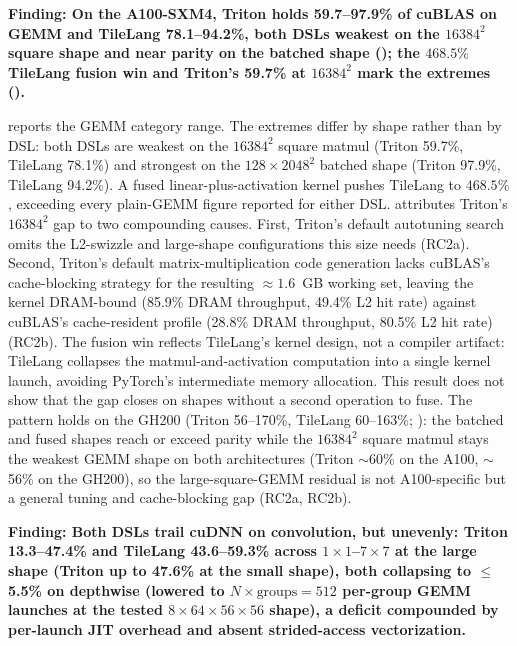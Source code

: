 \label{sec:eval:gemm}


\medskip\noindent\textbf{Finding: On the A100-SXM4, Triton holds 59.7--97.9\% of cuBLAS on GEMM and TileLang 78.1--94.2\%, both DSLs weakest on the $16384^2$ square shape and near parity on the batched shape (); the $468.5\%$ TileLang fusion win and Triton's 59.7\% at $16384^2$ mark the extremes ().}

 reports the GEMM category range. The extremes differ by shape rather than by DSL: both DSLs are weakest on the $16384^2$ square matmul (Triton 59.7\%, TileLang 78.1\%) and strongest on the $128\times2048^2$ batched shape (Triton 97.9\%, TileLang 94.2\%). A fused linear-plus-activation kernel pushes TileLang to $468.5\%$, exceeding every plain-GEMM figure reported for either DSL.
 attributes Triton's $16384^2$ gap to two compounding causes. First, Triton's default autotuning search omits the L2-swizzle and large-shape configurations this size needs (RC2a). Second, Triton's default matrix-multiplication code generation lacks cuBLAS's cache-blocking strategy for the resulting ${\approx}1.6$~GB working set, leaving the kernel DRAM-bound (85.9\% DRAM throughput, 49.4\% L2 hit rate) against cuBLAS's cache-resident profile (28.8\% DRAM throughput, 80.5\% L2 hit rate) (RC2b).
The fusion win reflects TileLang's kernel design, not a compiler artifact: TileLang collapses the matmul-and-activation computation into a single kernel launch, avoiding PyTorch's intermediate memory allocation. This result does not show that the gap closes on shapes without a second operation to fuse.
The pattern holds on the GH200 (Triton 56--170\%, TileLang 60--163\%; ): the batched and fused shapes reach or exceed parity while the $16384^2$ square matmul stays the weakest GEMM shape on both architectures (Triton $\sim$60\% on the A100, $\sim$56\% on the GH200), so the large-square-GEMM residual is not A100-specific but a general tuning and cache-blocking gap (RC2a, RC2b).

\label{sec:eval:conv}

\medskip\noindent\textbf{Finding: Both DSLs trail cuDNN on convolution, but unevenly: Triton 13.3--47.4\% and TileLang 43.6--59.3\% across $1\times1$--$7\times7$ at the large shape (Triton up to 47.6\% at the small shape), both collapsing to $\le$5.5\% on depthwise (lowered to $N\times\text{groups} = 512$ per-group GEMM launches at the tested $8\times64\times56\times56$ shape), a deficit compounded by per-launch JIT overhead and absent strided-access vectorization.}

